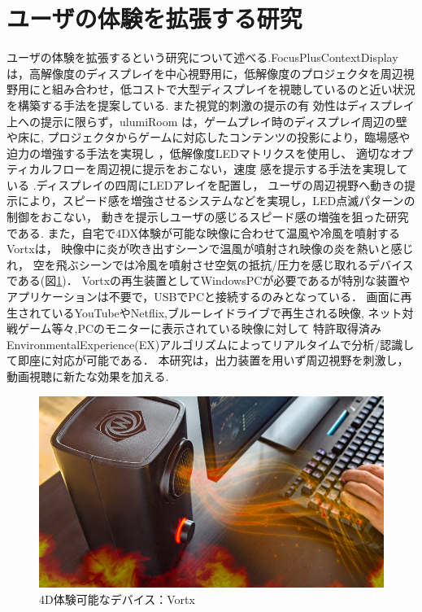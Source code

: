 \section{ユーザの体験を拡張する研究}     
ユーザの体験を拡張するという研究について述べる.FocusPlusContextDisplayは，高解像度のディスプレイを中心視野用に，低解像度のプロジェクタを周辺視野用にと組み合わせ，低コストで大型ディスプレイを視聴しているのと近い状況を構築する手法を提案している\cite{shamo9}.
また視覚的刺激の提示の有 効性はディスプレイ上への提示に限らず，ulumiRoom は，ゲームプレイ時のディスプレイ周辺の壁や床に,
プロジェクタからゲームに対応したコンテンツの投影により，臨場感や迫力の増強する手法を実現し \cite{shamo10}，低解像度LEDマトリクスを使用し、
適切なオプティカルフローを周辺視に提示をおこない，速度 感を提示する手法を実現している \cite{shamo11}.ディスプレイの四周にLEDアレイを配置し，
ユーザの周辺視野へ動きの提示により，スピード感を増強させるシステムなどを実現し，LED点滅パターンの制御をおこない，
動きを提示しユーザの感じるスピード感の増強を狙った研究である\cite{shamo12}.
また，自宅で4DX体験が可能な映像に合わせて温風や冷風を噴射するVortxは，
映像中に炎が吹き出すシーンで温風が噴射され映像の炎を熱いと感じれ，
空を飛ぶシーンでは冷風を噴射させ空気の抵抗/圧力を感じ取れるデバイスである(図\ref{vortx})．
Vortxの再生装置としてWindowsPCが必要であるが特別な装置やアプリケーションは不要で，USBでPCと接続するのみとなっている．
画面に再生されているYouTubeやNetflix,ブルーレイドライブで再生される映像,
ネット対戦ゲーム等々,PCのモニターに表示されている映像に対して
特許取得済みEnvironmentalExperience(EX)アルゴリズムによってリアルタイムで分析/認識して即座に対応が可能である\cite{vortx}．
本研究は，出力装置を用いず周辺視野を刺激し，動画視聴に新たな効果を加える. 

\begin{figure}[H]
  \centering
  \includegraphics[width=15cm]{images/chapter2/vortx.png}
  \caption{4D体験可能なデバイス：Vortx}
  \label{vortx}
\end{figure}